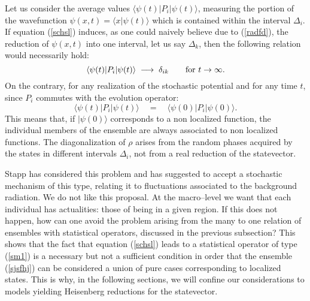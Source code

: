 \documentclass[12pt]{article}
\begin{document}
Let us consider the average values $\langle \psi(t)| P_{i}
|\psi(t)\rangle$, measuring the portion of the wavefunction
$\psi(x, t) = \langle x|\psi(t)\rangle$ which is contained within
the interval $\Delta_{i}$. If equation (\ref{schsl}) induces, as
one could naively believe due to (\ref{radfd}), the reduction of
$\psi(x,t)$ into one interval, let us say $\Delta_{k}$, then the
following relation would necessarily hold:
\begin{equation}
\langle \psi(t)| P_{i} |\psi(t)\rangle \; \longrightarrow \;
\delta_{ik} \qquad \makebox{for $t \rightarrow \infty$}.
\end{equation}
On the contrary, for any realization of the stochastic potential
and for any time $t$, since $P_{i}$ commutes with the evolution operator:
\begin{equation}
\langle \psi(t)| P_{i} |\psi(t)\rangle \quad = \quad \langle
\psi(0)| P_{i} |\psi(0)\rangle.
\end{equation}
This means that, if $|\psi(0)\rangle$ corresponds to a non
localized function, the individual members of the ensemble are
always associated to non localized functions. The diagonalization
of $\rho$ arises from the random phases acquired by the states in
different intervals $\Delta_{i}$, not from a real reduction of the
statevector.

Stapp \cite{std} has considered this problem and has suggested to
accept a stochastic mechanism of this type, relating it to
fluctuations associated to the background radiation. We do not
like this proposal. At the macro--level we want that each
individual has actualities: those of being in a given region. If
this does not happen, how can one avoid the problem arising from
the many to one relation of ensembles with statistical operators,
discussed in the previous subsection? This shows that the fact
that equation (\ref{schsl}) leads to a statistical operator of
type (\ref{sm1}) is a necessary but not a sufficient condition in
order that the ensemble (\ref{sjsfhj}) can be considered a union
of pure cases corresponding to localized states. This is why, in
the following sections, we will confine our considerations to
models yielding Heisenberg reductions for the statevector.
\end{document}
